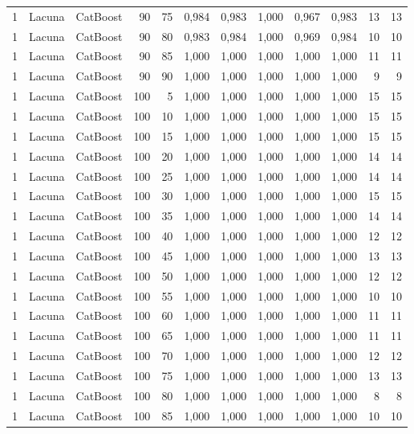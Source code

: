 \begin{longtable}{@{}rllrrrrrrrrr@{}}
1 & Lacuna & CatBoost & 90 & 75 & 0,984 & 0,983 & 1,000 & 0,967 & 0,983 & 13 & 13 \\
1 & Lacuna & CatBoost & 90 & 80 & 0,983 & 0,984 & 1,000 & 0,969 & 0,984 & 10 & 10 \\
1 & Lacuna & CatBoost & 90 & 85 & 1,000 & 1,000 & 1,000 & 1,000 & 1,000 & 11 & 11 \\
1 & Lacuna & CatBoost & 90 & 90 & 1,000 & 1,000 & 1,000 & 1,000 & 1,000 & 9 & 9 \\
1 & Lacuna & CatBoost & 100 & 5 & 1,000 & 1,000 & 1,000 & 1,000 & 1,000 & 15 & 15 \\
1 & Lacuna & CatBoost & 100 & 10 & 1,000 & 1,000 & 1,000 & 1,000 & 1,000 & 15 & 15 \\
1 & Lacuna & CatBoost & 100 & 15 & 1,000 & 1,000 & 1,000 & 1,000 & 1,000 & 15 & 15 \\
1 & Lacuna & CatBoost & 100 & 20 & 1,000 & 1,000 & 1,000 & 1,000 & 1,000 & 14 & 14 \\
1 & Lacuna & CatBoost & 100 & 25 & 1,000 & 1,000 & 1,000 & 1,000 & 1,000 & 14 & 14 \\
1 & Lacuna & CatBoost & 100 & 30 & 1,000 & 1,000 & 1,000 & 1,000 & 1,000 & 15 & 15 \\
1 & Lacuna & CatBoost & 100 & 35 & 1,000 & 1,000 & 1,000 & 1,000 & 1,000 & 14 & 14 \\
1 & Lacuna & CatBoost & 100 & 40 & 1,000 & 1,000 & 1,000 & 1,000 & 1,000 & 12 & 12 \\
1 & Lacuna & CatBoost & 100 & 45 & 1,000 & 1,000 & 1,000 & 1,000 & 1,000 & 13 & 13 \\
1 & Lacuna & CatBoost & 100 & 50 & 1,000 & 1,000 & 1,000 & 1,000 & 1,000 & 12 & 12 \\
1 & Lacuna & CatBoost & 100 & 55 & 1,000 & 1,000 & 1,000 & 1,000 & 1,000 & 10 & 10 \\
1 & Lacuna & CatBoost & 100 & 60 & 1,000 & 1,000 & 1,000 & 1,000 & 1,000 & 11 & 11 \\
1 & Lacuna & CatBoost & 100 & 65 & 1,000 & 1,000 & 1,000 & 1,000 & 1,000 & 11 & 11 \\
1 & Lacuna & CatBoost & 100 & 70 & 1,000 & 1,000 & 1,000 & 1,000 & 1,000 & 12 & 12 \\
1 & Lacuna & CatBoost & 100 & 75 & 1,000 & 1,000 & 1,000 & 1,000 & 1,000 & 13 & 13 \\
1 & Lacuna & CatBoost & 100 & 80 & 1,000 & 1,000 & 1,000 & 1,000 & 1,000 & 8 & 8 \\
1 & Lacuna & CatBoost & 100 & 85 & 1,000 & 1,000 & 1,000 & 1,000 & 1,000 & 10 & 10 \\

\end{longtable}
